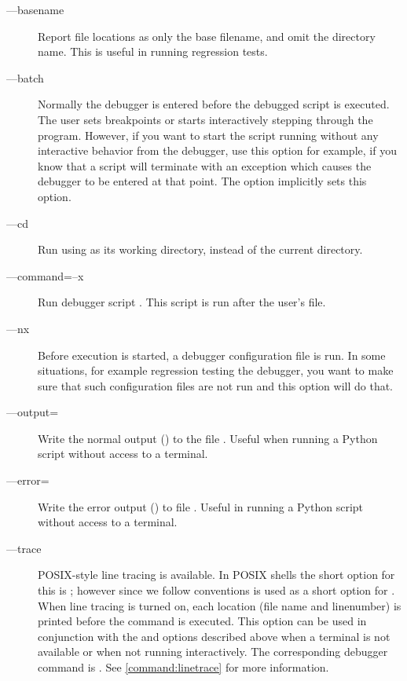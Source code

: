 \begin{description} 

\item[--{}--basename]

Report file locations as only the base filename, and omit the
directory name. This is useful in running regression tests.

\item[--{}--batch]

Normally the debugger is entered before the debugged script is
executed. The user sets breakpoints or starts interactively stepping
through the program. However, if you want to start the script running
without any interactive behavior from the debugger, use this option
for example, if you know that a script will terminate with an
exception which causes the debugger to be entered at that point. The
 option implicitly sets this option.

\item[--{}--cd ]

Run  using  as its working directory,
instead of the current directory.

\item[--{}--command=\code{\Large{|}}--x ]\label{switch:command}

Run debugger script . This script is run after
the user's  file.

\item[--{}--nx\code{\Large{|}}]\label{switch:nx}

Before execution is started, a debugger configuration file
 is run. In some situations, for example regression
testing the debugger, you want to make sure that such configuration
files are not run and this option will do that.

\item[--{}--output=]

Write the normal output () to the file
. Useful when running a Python script without access to
a terminal.

\item[--{}--error=]

Write the error output
() to file . Useful in
 running a Python script without access to a terminal.

\item[--{}--trace]\label{switch:trace}

POSIX-style line tracing is available. In POSIX shells the short
option for this is ; however since we follow 
conventions  is used as a short option for
. When line tracing is turned on, each location (file
name and linenumber) is printed before the command is executed. This
option can be used in conjunction with the  and
 options described above when a terminal is not
available or when not running interactively. The corresponding
debugger command is . See
\ref{command:linetrace} for more information.

\end{description}

